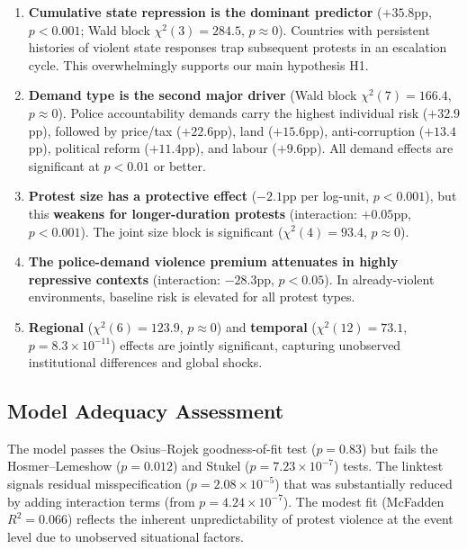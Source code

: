 \documentclass[12pt,a4paper]{article}
\begin{document}
\begin{enumerate}
  \item \textbf{Cumulative state repression is the dominant predictor} ($+35.8$pp, $p < 0.001$; Wald block $\chi^2(3) = 284.5$, $p \approx 0$). Countries with persistent histories of violent state responses trap subsequent protests in an escalation cycle. This overwhelmingly supports our main hypothesis H1.

  \item \textbf{Demand type is the second major driver} (Wald block $\chi^2(7) = 166.4$, $p \approx 0$). Police accountability demands carry the highest individual risk ($+32.9$pp), followed by price/tax ($+22.6$pp), land ($+15.6$pp), anti-corruption ($+13.4$pp), political reform ($+11.4$pp), and labour ($+9.6$pp). All demand effects are significant at $p < 0.01$ or better.

  \item \textbf{Protest size has a protective effect} ($-2.1$pp per log-unit, $p < 0.001$), but this \textbf{weakens for longer-duration protests} (interaction: $+0.05$pp, $p < 0.001$). The joint size block is significant ($\chi^2(4) = 93.4$, $p \approx 0$).

  \item \textbf{The police-demand violence premium attenuates in highly repressive contexts} (interaction: $-28.3$pp, $p < 0.05$). In already-violent environments, baseline risk is elevated for all protest types.

  \item \textbf{Regional} ($\chi^2(6) = 123.9$, $p \approx 0$) and \textbf{temporal} ($\chi^2(12) = 73.1$, $p = 8.3 \times 10^{-11}$) effects are jointly significant, capturing unobserved institutional differences and global shocks.
\end{enumerate}

\subsection{Model Adequacy Assessment}

The model passes the Osius--Rojek goodness-of-fit test ($p = 0.83$) but fails the Hosmer--Lemeshow ($p = 0.012$) and Stukel ($p = 7.23 \times 10^{-7}$) tests. The linktest signals residual misspecification ($p = 2.08 \times 10^{-5}$) that was substantially reduced by adding interaction terms (from $p = 4.24 \times 10^{-7}$). The modest fit (McFadden $R^2 = 0.066$) reflects the inherent unpredictability of protest violence at the event level due to unobserved situational factors.
\end{document}
